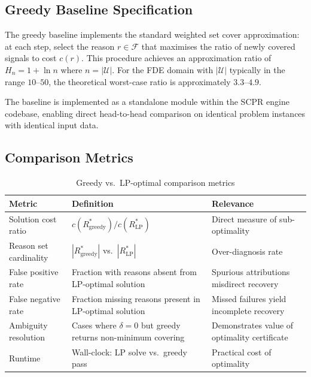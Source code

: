 \documentclass[11pt,a4paper]{report}
\newcommand{\calU}{\mathcal{U}}
\newcommand{\calF}{\mathcal{F}}
\begin{document}
\subsection{Greedy Baseline Specification}

The greedy baseline implements the standard weighted set cover approximation: at each step,
select the reason $r \in \calF$ that maximises the ratio of newly covered signals to cost
$c(r)$. This procedure achieves an approximation ratio of $H_n = 1 + \ln n$ where
$n = |\calU|$. For the FDE domain with $|\calU|$ typically in the range $10$--$50$, the
theoretical worst-case ratio is approximately $3.3$--$4.9$.

The baseline is implemented as a standalone module within the SCPR engine codebase,
enabling direct head-to-head comparison on identical problem instances with identical input
data.

\subsection{Comparison Metrics}

\begin{table}[htbp]
\centering
\caption{Greedy vs.\ LP-optimal comparison metrics}
\label{tab:compmetrics}
\begin{tabular}{@{}p{3.8cm}p{4.8cm}p{3.4cm}@{}}
\toprule
\textbf{Metric} & \textbf{Definition} & \textbf{Relevance} \\
\midrule
Solution cost ratio           & $c(R^*_{\mathrm{greedy}}) / c(R^*_{\mathrm{LP}})$ & Direct measure of sub-optimality \\
Reason set cardinality        & $|R^*_{\mathrm{greedy}}|$ vs.\ $|R^*_{\mathrm{LP}}|$ & Over-diagnosis rate \\
False positive rate           & Fraction with reasons absent from LP-optimal solution & Spurious attributions misdirect recovery \\
False negative rate           & Fraction missing reasons present in LP-optimal solution & Missed failures yield incomplete recovery \\
Ambiguity resolution          & Cases where $\delta = 0$ but greedy returns non-minimum covering & Demonstrates value of optimality certificate \\
Runtime                       & Wall-clock: LP solve vs.\ greedy pass & Practical cost of optimality \\
\bottomrule
\end{tabular}
\end{table}
\end{document}

